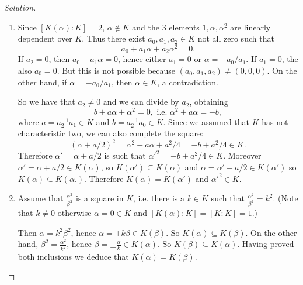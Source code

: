 \documentclass[a4paper,10pt,reqno]{amsart}
\theoremstyle{definition} %
\newenvironment{sol}
  {\renewcommand\qedsymbol{$\blacksquare$}\begin{proof}[Solution]}
  {\end{proof}}
\begin{document}
\begin{sol}~
    \begin{enumerate}[label=(\roman*)]
        \item Since $[K(\alpha):K]=2$, $\alpha\not\in K$ and the 3 
        elements $1,\alpha,\alpha^2$ are linearly dependent over $K$.
        Thus there exist $a_0,a_1,a_2\in K$ not all zero such that 
        \[
        a_0+a_1\alpha+a_2\alpha^2=0.
        \]
        If $a_2=0$, then $a_0+a_1\alpha=0$, hence either $a_1=0$ or 
        $\alpha=-a_0/a_1$. 
        If $a_1=0$, the also $a_0=0$. But this is not possible 
        because $(a_0,a_1,a_2)\neq (0,0,0)$.
        On the other hand, if $\alpha=-a_0/a_1$, then $\alpha\in K$, a contradiction.

        So we have that $a_2\neq 0$ and we can divide by $a_2$,
        obtaining
        \[        b+a\alpha+\alpha^2=0, \text{ i.e. } \alpha^2+a\alpha=-b,
        \]
        where $a=a_2^{-1}a_1\in K$ and $b=a_2^{-1}a_0\in K$. 
        Since we assumed that $K$ has not characteristic two,
        we can also complete the square:
        \[
        (\alpha+a/2)^2=\alpha^2+a\alpha+a^2/4=-b+a^2/4\in K.
        \]
        Therefore $\alpha'=\alpha+a/2$
        is such that $\alpha'^2=-b+a^2/4\in K$.
        Moreover $\alpha'=\alpha+a/2\in K(\alpha)$, so $K(\alpha')\subseteq K(\alpha)$ and $\alpha=\alpha'-a/2\in K(\alpha')$ so $K(\alpha)\subseteq K(\alpha.)$. Therefore $K(\alpha)=K(\alpha')$ and $\alpha'^2\in K$.
        \item Assume that $\frac{\alpha^2}{\beta^2}$ is a square in $K$,
        i.e. there is a $k\in K$ such that
        $\frac{\alpha^2}{\beta^2}=k^2$.
        (Note that $k\neq 0$ otherwise $\alpha=0\in K$
        and $[K(\alpha):K]=[K:K]=1$.)

        Then $\alpha=k^2\beta^2$, hence $\alpha=\pm k\beta\in K(\beta)$. So $K(\alpha)\subseteq K(\beta)$.
        On the other hand, $\beta^2=\frac{\alpha^2}{k^2}$, hence $\beta=\pm \frac{\alpha}{k}\in K(\alpha)$. So $K(\beta)\subseteq K(\alpha)$.
        Having proved both inclusions we deduce that 
        $K(\alpha)=K(\beta)$.


\end{enumerate}
\end{sol}
\end{document}
